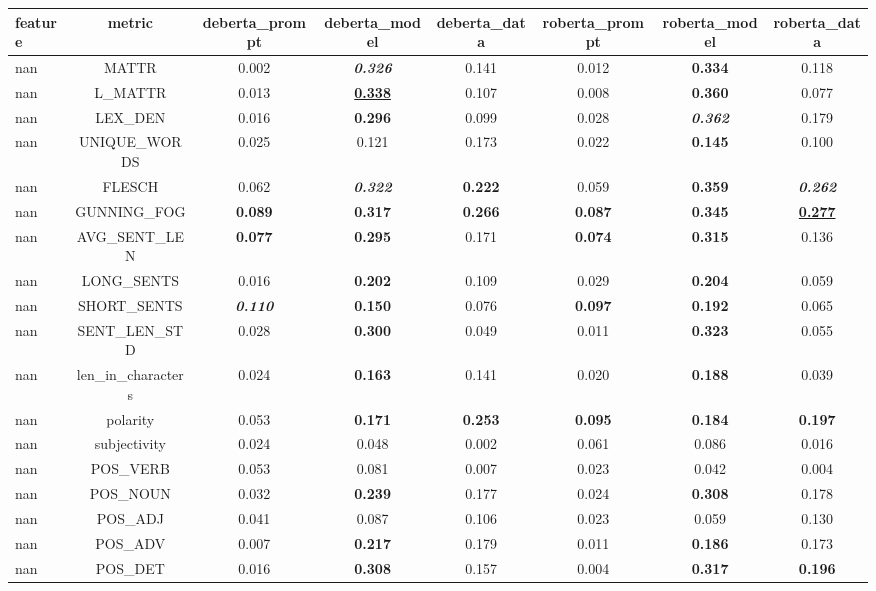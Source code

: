 \begin{table}[ht]
\centering
\begin{tabular}{lccccccc}
\toprule
feature & metric & deberta_prompt & deberta_model & deberta_data & roberta_prompt & roberta_model & roberta_data \\
\midrule
nan & MATTR & 0.002 & \textit{\textbf{0.326}} & 0.141 & 0.012 & \textbf{0.334} & 0.118 \\
nan & L_MATTR & 0.013 & \textbf{\underline{\textbf{0.338}}} & 0.107 & 0.008 & \textbf{0.360} & 0.077 \\
nan & LEX_DEN & 0.016 & \textbf{0.296} & 0.099 & 0.028 & \textit{\textbf{0.362}} & 0.179 \\
nan & UNIQUE_WORDS & 0.025 & 0.121 & 0.173 & 0.022 & \textbf{0.145} & 0.100 \\
nan & FLESCH & 0.062 & \textit{\textbf{0.322}} & \textbf{0.222} & 0.059 & \textbf{0.359} & \textit{\textbf{0.262}} \\
nan & GUNNING_FOG & \textbf{0.089} & \textbf{0.317} & \textbf{0.266} & \textbf{0.087} & \textbf{0.345} & \textbf{\underline{\textbf{0.277}}} \\
nan & AVG_SENT_LEN & \textbf{0.077} & \textbf{0.295} & 0.171 & \textbf{0.074} & \textbf{0.315} & 0.136 \\
nan & LONG_SENTS & 0.016 & \textbf{0.202} & 0.109 & 0.029 & \textbf{0.204} & 0.059 \\
nan & SHORT_SENTS & \textit{\textbf{0.110}} & \textbf{0.150} & 0.076 & \textbf{0.097} & \textbf{0.192} & 0.065 \\
nan & SENT_LEN_STD & 0.028 & \textbf{0.300} & 0.049 & 0.011 & \textbf{0.323} & 0.055 \\
nan & len_in_characters & 0.024 & \textbf{0.163} & 0.141 & 0.020 & \textbf{0.188} & 0.039 \\
nan & polarity & 0.053 & \textbf{0.171} & \textbf{0.253} & \textbf{0.095} & \textbf{0.184} & \textbf{0.197} \\
nan & subjectivity & 0.024 & 0.048 & 0.002 & 0.061 & 0.086 & 0.016 \\
nan & POS_VERB & 0.053 & 0.081 & 0.007 & 0.023 & 0.042 & 0.004 \\
nan & POS_NOUN & 0.032 & \textbf{0.239} & 0.177 & 0.024 & \textbf{0.308} & 0.178 \\
nan & POS_ADJ & 0.041 & 0.087 & 0.106 & 0.023 & 0.059 & 0.130 \\
nan & POS_ADV & 0.007 & \textbf{0.217} & 0.179 & 0.011 & \textbf{0.186} & 0.173 \\
nan & POS_DET & 0.016 & \textbf{0.308} & 0.157 & 0.004 & \textbf{0.317} & \textbf{0.196} \\

\end{tabular}
\end{table}

